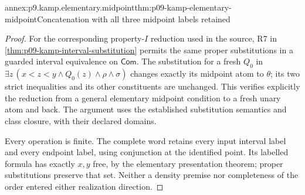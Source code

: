 \begin{annexitem}{annex:p9.kamp.elementary.midpoint}{thm:p09-kamp-elementary-midpoint}{Concatenation with all three midpoint labels retained}
\begin{proof}
For the corresponding property-\(I\) reduction used in the source,
R7 in \cref{thm:p09-kamp-interval-substitution} permits the same
proper substitutions in a guarded interval equivalence on
\(\mathsf{Com}\). The substitution for a fresh \(Q_0\) in
\(\exists z\,(x<z<y\land Q_0(z)\land\rho\land\sigma)\) changes
exactly its midpoint atom to \(\theta\); its two strict inequalities
and its other constituents are unchanged. This verifies explicitly
the reduction from a general elementary midpoint condition to a
fresh unary atom and back. The argument uses the established
substitution semantics and class closure, with their declared domains.

Every operation is finite. The complete word retains every input
interval label and every endpoint label, using conjunction at the
identified point. Its labelled formula has exactly \(x,y\) free,
by the elementary presentation theorem; proper substitutions preserve
that set. Neither a density premise nor completeness of the order
entered either realization direction.
\end{proof}
\end{annexitem}

